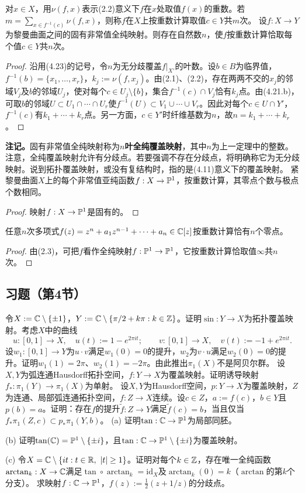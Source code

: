 对$x\in X$，用$\nu(f,x)$表示(2.2)意义下$f$在$x$处取值$f(x)$的重数。若$m=\sum_{x\in f^{-1}(c)}\nu(f,x)$，则称$f$在$X$上按重数计算取值$c\in Y$共$m$次。
设$f:X\to Y$为黎曼曲面之间的固有非常值全纯映射。则存在自然数$n$，使$f$按重数计算恰取每个值$c\in Y$共$n$次。
\begin{proof}
沿用(4.23)的记号，令$n$为无分歧覆盖$f|_{X'}$的叶数。设$b\in B$为临界值，$f^{-1}(b)=\{x_1,\ldots,x_r\}$，$k_j:=\nu(f,x_j)$。由(2.1)、(2.2)，存在两两不交的$x_j$的邻域$V_j$及$b$的邻域$U_j$，使对每个$c\in U_j\setminus\{b\}$，集合$f^{-1}(c)\cap V_j$恰有$k_j$点。由(4.21.b)，可取$b$的邻域$U\subset U_1\cap\cdots\cap U_r$使$f^{-1}(U)\subset V_1\cup\cdots\cup V_r$。因此对每个$c\in U\cap Y'$，$f^{-1}(c)$有$k_1+\cdots+k_r$点。另一方面，$c\in Y'$时纤维基数为$n$，故$n=k_1+\cdots+k_r$。
\end{proof}
\textbf{注记。}固有非常值全纯映射称为\textbf{$n$叶全纯覆盖映射}，其中$n$为上一定理中的整数。注意，全纯覆盖映射允许有分歧点。若要强调不存在分歧点，将明确称它为无分歧映射。说到拓扑覆盖映射，或没有复结构时，指的是(4.11)意义下的覆盖映射。
紧黎曼曲面$X$上的每个非常值亚纯函数$f:X\to\mathbb P^1$，按重数计算，其零点个数与极点个数相同。
\begin{proof}映射$f:X\to\mathbb P^1$是固有的。\end{proof}
任意$n$次多项式$f(z)=z^n+a_1z^{n-1}+\cdots+a_n\in\mathbb C[z]$按重数计算恰有$n$个零点。
\begin{proof}
由(2.3)，可把$f$看作全纯映射$f:\mathbb P^1\to\mathbb P^1$，它按重数计算恰取值$\infty$共$n$次。
\end{proof}
\subsection*{习题（第4节）}
令$X:=\mathbb C\setminus\{\pm1\}$，$Y:=\mathbb C\setminus\{\pi/2+k\pi:k\in\mathbb Z\}$。证明$\sin:Y\to X$为拓扑覆盖映射。考虑$X$中的曲线
\[
u:[0,1]\to X,\quad u(t):=1-e^{2\pi it};\qquad
v:[0,1]\to X,\quad v(t):=-1+e^{2\pi it}.
\]
设$w_1:[0,1]\to Y$为$u\cdot v$满足$w_1(0)=0$的提升，$w_2$为$v\cdot u$满足$w_2(0)=0$的提升。证明$w_1(1)=2\pi$、$w_2(1)=-2\pi$。由此推出$\pi_1(X)$不是阿贝尔群。
设$X,Y$为弧连通Hausdorff拓扑空间，$f:Y\to X$为覆盖映射。证明诱导映射$f_*:\pi_1(Y)\to\pi_1(X)$为单射。
设$X,Y$为Hausdorff空间，$p:Y\to X$为覆盖映射，$Z$为连通、局部弧连通拓扑空间，$f:Z\to X$连续。设$c\in Z$，$a:=f(c)$，$b\in Y$且$p(b)=a$。证明：存在$f$的提升$\widetilde f:Z\to Y$满足$\widetilde f(c)=b$，当且仅当$f_*\pi_1(Z,c)\subset p_*\pi_1(Y,b)$。
(a) 证明$\tan:\mathbb C\to\mathbb P^1$为局部同胚。

(b) 证明$\tan(\mathbb C)=\mathbb P^1\setminus\{\pm i\}$，且$\tan:\mathbb C\to\mathbb P^1\setminus\{\pm i\}$为覆盖映射。

(c) 令$X=\C\setminus\{it:t\in\R,\ |t|\ge1\}$。证明对每个$k\in\mathbb Z$，存在唯一全纯函数$\arctan_k:X\to\mathbb C$满足$\tan\circ\arctan_k=\mathrm{id}_X$及$\arctan_k(0)=k$（$\arctan$的第$k$个分支）。
求映射$f:\mathbb C\to\mathbb P^1$，$f(z):=\tfrac12(z+1/z)$的分歧点。
